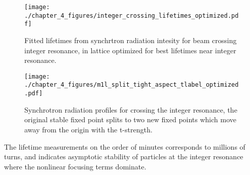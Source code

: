 \begin{figure}
	\centering
	\texttt{[image: ./chapter\_4\_figures/integer\_crossing\_lifetimes\_optimized.pdf]}
	\caption{Fitted lifetimes from synchrtron radiation intesity for beam crossing integer resonance, in lattice optimized for best lifetimes near integer resonance.}
	\label{fig:synchLifeOpt}
\end{figure}

\begin{figure}
	\centering
	\texttt{[image: ./chapter\_4\_figures/m1l\_split\_tight\_aspect\_tlabel\_optimized.pdf]}
	\caption{Synchrotron radiation profiles for crossing the integer resonance, the original stable fixed point splits to two new fixed points which move away from the origin with the t-strength.}
	\label{fig:intCrossSynchOpt}
\end{figure}

The lifetime measurements on the order of minutes corresponds to millions of turns, and indicates asymptotic stability of particles at the integer resonance where the nonlinear focusing terms dominate.
